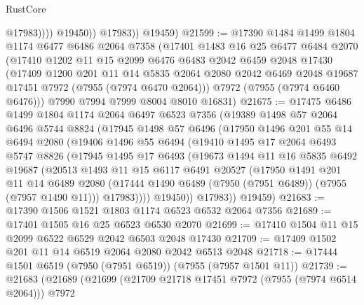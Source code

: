 \begin{lexlean}{RustCore}
\begin{coremodule}
                      @17983))))
              @19450))
          @17983))
      @19459)
@21599 := @17390
    @1484
    @1499
    @1804
    @1174
    @6477
    @6486
    @2064
    @7358
    (@17401
      @1483
      @16
      @25
      @6477
      @6484
      @2070
      (@17410
        @1202
        @11
        @15
        @2099
        @6476
        @6483
        @2042
        @6459
        @2048
        @17430
        (@17409
          @1200
          @201
          @11
          @14
          @5835
          @2064
          @2080
          @2042
          @6469
          @2048
          @19687
          @17451
          @7972
          (@7955 (@7974 @6470 @2064)))
        @7972
        (@7955 (@7974 @6460 @6476)))
      @7990
      @7994
      @7999
      @8004
      @8010
      @16831)
@21675 := @17475
    @6486
    @1499
    @1804
    @1174
    @2064
    @6497
    @6523
    @7356
    (@19389
      @1498
      @57
      @2064
      @6496
      @5744
      @8824
      (@17945
        @1498
        @57
        @6496
        (@17950
          @1496
          @201
          @55
          @14
          @6494
          @2080
          (@19406
            @1496
            @55
            @6494
            (@19410
              @1495
              @17
              @2064
              @6493
              @5747
              @8826
              (@17945
                @1495
                @17
                @6493
                (@19673
                  @1494
                  @11
                  @16
                  @5835
                  @6492
                  @19687
                  (@20513
                    @1493
                    @11
                    @15
                    @6117
                    @6491
                    @20527
                    (@17950
                      @1491
                      @201
                      @11
                      @14
                      @6489
                      @2080
                      (@17444 @1490 @6489 (@7950 (@7951 @6489)) (@7955 (@7957 @1490 @11)))
                      @17983))))
              @19450))
          @17983))
      @19459)
@21683 := @17390 @1506 @1521 @1803 @1174 @6523 @6532 @2064 @7356
@21689 := @17401 @1505 @16 @25 @6523 @6530 @2070
@21699 := @17410 @1504 @11 @15 @2099 @6522 @6529 @2042 @6503 @2048 @17430
@21709 := @17409 @1502 @201 @11 @14 @6519 @2064 @2080 @2042 @6513 @2048
@21718 := @17444 @1501 @6519 (@7950 (@7951 @6519)) (@7955 (@7957 @1501 @11))
@21739 := @21683
    (@21689
      (@21699
        (@21709 @21718 @17451 @7972 (@7955 (@7974 @6514 @2064)))
        @7972

\end{coremodule}
\end{lexlean}
